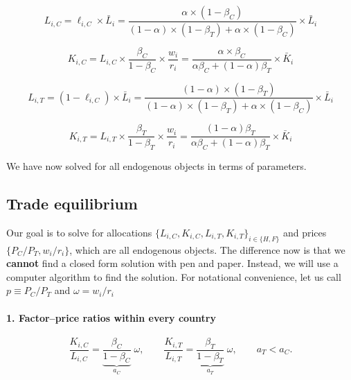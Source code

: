 \documentclass[11pt,letterpaper]{article}
\begin{document}
\begin{equation*}
    \boxed{
    L_{i,C} = \ell_{i,C} \times \bar{L}_i =  \frac{\alpha \times (1-\beta_C)}{(1-\alpha)\times(1-\beta_T)+ \alpha\times(1-\beta_C)} \times \bar{L}_i }
\end{equation*}

\begin{equation*}
    \boxed{
    K_{i,C} = L_{i,C} \times \frac{\beta_C}{1-\beta_C} \times \frac{w_i}{r_i} = \frac{\alpha \times \beta_C}{\alpha \beta_C + (1-\alpha)\beta_T} \times \bar{K}_i
     }
\end{equation*}


\begin{equation*}
    \boxed{
    L_{i,T} = (1-\ell_{i,C}) \times \bar{L}_i =  \frac{(1-\alpha)\times(1-\beta_T)}{(1-\alpha)\times(1-\beta_T)+ \alpha\times(1-\beta_C)} \times \bar{L}_i
     }
\end{equation*}



\begin{equation*}
    \boxed{
    K_{i,T} = L_{i,T} \times \frac{\beta_T}{1-\beta_T} \times \frac{w_i}{r_i} = \frac{ (1-\alpha)\beta_T}{\alpha \beta_C + (1-\alpha)\beta_T} \times \bar{K}_i
     }
\end{equation*}

We have now solved for all endogenous objects in terms of parameters.




\subsection*{Trade equilibrium}


Our goal is to solve for allocations $\{L_{i,C}, K_{i,C}, L_{i,T}, K_{i,T}\}_{i\in\{H,F\}}$ and prices $\{P_{C}/P_T, w_i /r_i\}$, which are all endogenous objects. The difference now is that we \textbf{cannot} find a closed form solution with pen and paper. Instead, we will use a computer algorithm to find the solution. For notational convenience, let us call $p \equiv P_{C}/P_T$ and $\omega = w_i /r_i$


\paragraph{1.  Factor–price ratios within every country}
\[
\frac{K_{i,C}}{L_{i,C}} = 
      \underbrace{\frac{\beta_C}{1-\beta_C}}_{a_C}\;
      \omega,
\qquad
\frac{K_{i,T}}{L_{i,T}} = 
      \underbrace{\frac{\beta_T}{1-\beta_T}}_{a_T}\;
      \omega,
\qquad a_T<a_C.
\tag{FP}
\]
\end{document}
